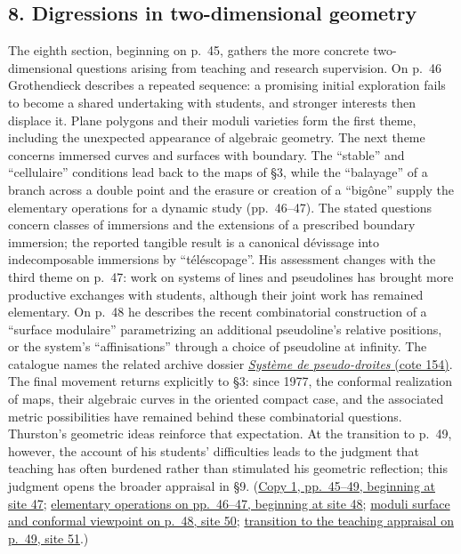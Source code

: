 \subsection*{8. Digressions in two-dimensional geometry}
The eighth section, beginning on p.~45, gathers the more concrete
two-dimensional questions arising from teaching and research supervision.
On p.~46 Grothendieck describes a repeated sequence: a promising initial
exploration fails to become a shared undertaking with students, and
stronger interests then displace it. Plane polygons and their moduli
varieties form the first theme, including the unexpected appearance of
algebraic geometry. The next theme concerns immersed curves and surfaces
with boundary. The ``stable'' and ``cellulaire'' conditions lead back to
the maps of \S3, while the ``balayage'' of a branch across a double point
and the erasure or creation of a ``bigône'' supply the elementary
operations for a dynamic study (pp.~46--47). The stated questions concern
classes of immersions and the extensions of a prescribed boundary
immersion; the reported tangible result is a canonical dévissage into
indecomposable immersions by ``téléscopage''. His assessment changes with
the third theme on p.~47: work on systems of lines and pseudolines has
brought more productive exchanges with students, although their joint
work has remained elementary. On p.~48 he describes the recent
combinatorial construction of a ``surface modulaire'' parametrizing an
additional pseudoline's relative positions, or the system's
``affinisations'' through a choice of pseudoline at infinity. The
catalogue names the related archive dossier
\href{https://grothendieck.umontpellier.fr/archives-grothendieck/}{\emph{Système de pseudo-droites} (cote 154)}.
The final movement returns explicitly to \S3: since 1977, the conformal
realization of maps, their algebraic curves in the oriented compact case,
and the associated metric possibilities have remained behind these
combinatorial questions. Thurston's geometric ideas reinforce that
expectation. At the transition to p.~49, however, the account of his
students' difficulties leads to the judgment that teaching has often
burdened rather than stimulated his geometric reflection; this judgment
opens the broader appraisal in \S9.
(\href{https://grothendieck.umontpellier.fr/web/viewer.html?file=../119.pdf\#page=48}{Copy 1, pp.~45--49, beginning at site 47};
\href{https://grothendieck.umontpellier.fr/web/viewer.html?file=../119.pdf\#page=49}{elementary operations on pp.~46--47, beginning at site 48};
\href{https://grothendieck.umontpellier.fr/web/viewer.html?file=../119.pdf\#page=51}{moduli surface and conformal viewpoint on p.~48, site 50};
\href{https://grothendieck.umontpellier.fr/web/viewer.html?file=../119.pdf\#page=52}{transition to the teaching appraisal on p.~49, site 51}.)
